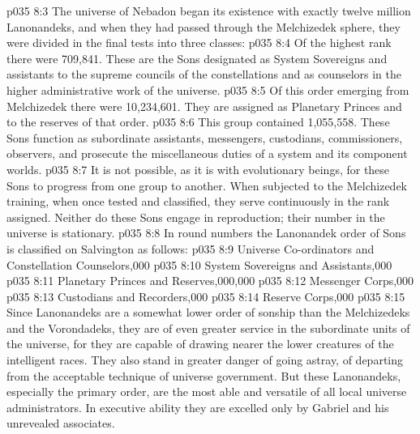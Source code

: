\vs p035 8:3 The universe of Nebadon began its existence with exactly twelve million Lanonandeks, and when they had passed through the Melchizedek sphere, they were divided in the final tests into three classes:
\pc \vs p035 8:4 \bibnobreakspace {} Of the highest rank there were 709,841. These are the Sons designated as System Sovereigns and assistants to the supreme councils of the constellations and as counselors in the higher administrative work of the universe.
\pc \vs p035 8:5 \bibnobreakspace {} Of this order emerging from Melchizedek there were 10,234,601. They are assigned as Planetary Princes and to the reserves of that order.
\pc \vs p035 8:6 \bibnobreakspace {} This group contained 1,055,558. These Sons function as subordinate assistants, messengers, custodians, commissioners, observers, and prosecute the miscellaneous duties of a system and its component worlds.
\pc \vs p035 8:7 It is not possible, as it is with evolutionary beings, for these Sons to progress from one group to another. When subjected to the Melchizedek training, when once tested and classified, they serve continuously in the rank assigned. Neither do these Sons engage in reproduction; their number in the universe is stationary.
\vs p035 8:8 In round numbers the Lanonandek order of Sons is classified on Salvington as follows:
\pc \vs p035 8:9 Universe Co\hyp{}ordinators and Constellation Counselors,000
\vs p035 8:10 System Sovereigns and Assistants,000
\vs p035 8:11 Planetary Princes and Reserves,000,000
\vs p035 8:12 Messenger Corps,000
\vs p035 8:13 Custodians and Recorders,000
\vs p035 8:14 Reserve Corps,000
\pc \vs p035 8:15 Since Lanonandeks are a somewhat lower order of sonship than the Melchizedeks and the Vorondadeks, they are of even greater service in the subordinate units of the universe, for they are capable of drawing nearer the lower creatures of the intelligent races. They also stand in greater danger of going astray, of departing from the acceptable technique of universe government. But these Lanonandeks, especially the primary order, are the most able and versatile of all local universe administrators. In executive ability they are excelled only by Gabriel and his unrevealed associates.
